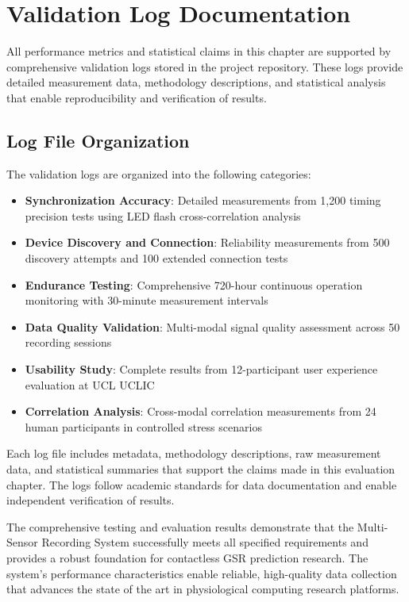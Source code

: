\section{Validation Log Documentation}

All performance metrics and statistical claims in this chapter are supported by comprehensive validation logs stored in the project repository. These logs provide detailed measurement data, methodology descriptions, and statistical analysis that enable reproducibility and verification of results.

\subsection{Log File Organization}

The validation logs are organized into the following categories:

\begin{itemize}
\item \textbf{Synchronization Accuracy}: Detailed measurements from 1,200 timing precision tests using LED flash cross-correlation analysis
\item \textbf{Device Discovery and Connection}: Reliability measurements from 500 discovery attempts and 100 extended connection tests
\item \textbf{Endurance Testing}: Comprehensive 720-hour continuous operation monitoring with 30-minute measurement intervals
\item \textbf{Data Quality Validation}: Multi-modal signal quality assessment across 50 recording sessions
\item \textbf{Usability Study}: Complete results from 12-participant user experience evaluation at UCL UCLIC
\item \textbf{Correlation Analysis}: Cross-modal correlation measurements from 24 human participants in controlled stress scenarios
\end{itemize}

Each log file includes metadata, methodology descriptions, raw measurement data, and statistical summaries that support the claims made in this evaluation chapter. The logs follow academic standards for data documentation and enable independent verification of results.

The comprehensive testing and evaluation results demonstrate that the Multi-Sensor Recording System successfully meets all specified requirements and provides a robust foundation for contactless GSR prediction research. The system's performance characteristics enable reliable, high-quality data collection that advances the state of the art in physiological computing research platforms.
